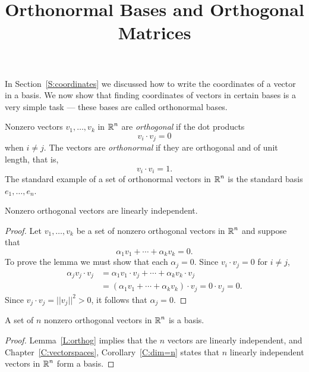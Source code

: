 \documentclass{ximera}
\title{Orthonormal Bases and Orthogonal Matrices}
\begin{document}
\begin{abstract}
\end{abstract}
\maketitle


\label{S:orthonormal}

In Section~\ref{S:coordinates} we discussed how to write the coordinates of
a vector in a basis.  We now show that finding coordinates of vectors in
certain bases is a very simple task --- these bases are called orthonormal
bases.

Nonzero vectors $v_1,\ldots,v_k$ in $\mbox{$\mathbb{R}$}^n$ are
{\em orthogonal\/} if the
dot products
\[
v_i\cdot v_j  =  0
\]
when $i\neq j$.  The vectors are
{\em orthonormal\/} if they are
orthogonal and of unit length, that is,
\[
v_i\cdot v_i=1.
\]
The standard example of a set of orthonormal vectors in $\mbox{$\mathbb{R}$}^n$ is the
standard basis $e_1,\ldots,e_n$.

\begin{lemma} \label{L:orthog}
Nonzero orthogonal vectors are
linearly independent.
\end{lemma}

\begin{proof}  Let $v_1,\ldots,v_k$ be a set of nonzero orthogonal vectors in $\mbox{$\mathbb{R}$}^n$
and suppose that
\[
\alpha_1v_1 + \cdots + \alpha_kv_k = 0.
\]
To prove the lemma we must show that each $\alpha_j=0$.  Since
$v_i\cdot v_j = 0$ for $i\not= j$,
\begin{align*}
  \alpha_jv_j\cdot v_j &= \alpha_1v_1\cdot v_j + \cdots + \alpha_kv_k\cdot v_j \\
  &= (\alpha_1v_1 + \cdots +\alpha_kv_k)\cdot v_j = 0\cdot v_j = 0.
\end{align*}
Since $v_j\cdot v_j = ||v_j||^2> 0$, it follows that $\alpha_j=0$.  \end{proof}

\begin{corollary} \label{C:symmetric_distinct}
A set of $n$ nonzero orthogonal vectors in $\mbox{$\mathbb{R}$}^n$ is a basis.
\end{corollary}

\begin{proof}  Lemma~\ref{L:orthog} implies that the $n$ vectors are linearly
independent, and Chapter~\ref{C:vectorspaces}, Corollary~\ref{C:dim=n} states
that $n$ linearly independent vectors in $\mbox{$\mathbb{R}$}^n$ form a basis.  \end{proof}
\end{document}
